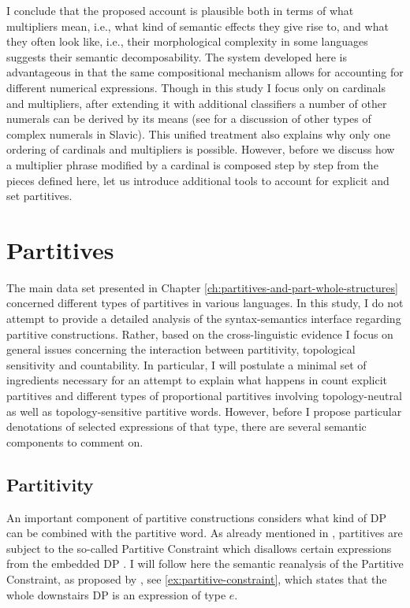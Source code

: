 	I conclude that the proposed account is plausible both in terms of what multipliers mean, i.e., what kind of semantic effects they give rise to, and what they often look like, i.e., their morphological complexity in some languages suggests their semantic decomposability. The system developed here is advantageous in that the same compositional mechanism allows for accounting for different numerical expressions. Though in this study I focus only on cardinals and multipliers, after extending it with additional classifiers a number of other numerals can be derived by its means (see \citealt{docekal2012atoms,docekal2013numerals,wagiel2014boys,wagiel2015sums,wagiel2020several,docekal_wagiel2018event} for a discussion of other types of complex numerals in Slavic). This unified treatment also explains why only one ordering of cardinals and multipliers is possible. However, before we discuss how a multiplier phrase modified by a cardinal is composed step by step from the pieces defined here, let us introduce additional tools to account for explicit and set partitives.
	
	\section{Partitives}\label{sec:partitives-analysis}
	
	The main data set presented in Chapter \ref{ch:partitives-and-part-whole-structures} concerned different types of partitives in various languages. In this study, I do not attempt to provide a detailed analysis of the syntax-semantics interface regarding partitive constructions. Rather, based on the cross-linguistic evidence I focus on general issues concerning the interaction between partitivity, topological sensitivity and countability. In particular, I will postulate a minimal set of ingredients necessary for an attempt to explain what happens in count explicit partitives and different types of proportional partitives involving topology-neutral as well as topology-sensitive partitive words. However, before I propose particular denotations of selected expressions of that type, there are several semantic components to comment on.
	
	\subsection{Partitivity}\label{sec:partitivity}
	
	An important component of partitive constructions considers what kind of DP can be combined with the partitive word. As already mentioned in  , partitives are subject to the so-called Partitive Constraint which disallows certain expressions from the embedded DP \citep[e.g.,][]{jackendoff1977x-bar,selkirk1977some,barwise_cooper1981generalized,ladusaw1982semantic}. I will follow here the semantic reanalysis of the Partitive Constraint, as proposed by \citet{de_hoop1997semantic}, see \ref{ex:partitive-constraint}, which states that the whole downstairs DP is an expression of type $e$.
	

